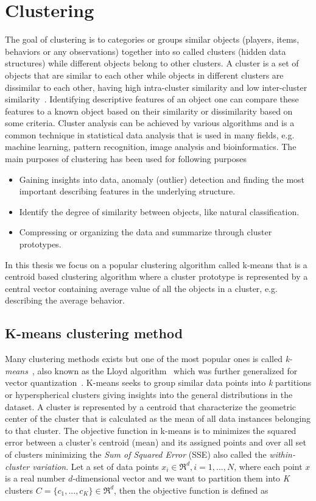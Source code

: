 \section{Clustering}
The goal of clustering is to categories or groups similar objects (players, items, behaviors or any observations) together into so called clusters (hidden data structures) while different objects belong to other clusters. A cluster is a set of objects that are similar to each other while objects in different clusters are dissimilar to each other, having high intra-cluster similarity and low inter-cluster similarity~\citep{Xu:2009Clu}. Identifying descriptive features of an object one can compare these features to a known object based on their similarity or dissimilarity based on some criteria. Cluster analysis can be achieved by various algorithms and is a common technique in statistical data analysis that is used in many fields, e.g. machine learning, pattern recognition, image analysis and bioinformatics. The main purposes of clustering has been used for following purposes
\begin{itemize}
\item Gaining insights into data, anomaly (outlier) detection and finding the most important describing features in the underlying structure.
\item Identify the degree of similarity between objects, like natural classification.
\item Compressing or organizing the data and summarize through cluster prototypes.
\end{itemize}

In this thesis we focus on a popular clustering algorithm called k-means that is a centroid based clustering algorithm where a cluster prototype is represented by a central vector containing average value of all the objects in a cluster, e.g. describing the average behavior.

\subsection{K-means clustering method}
\label{subsec:kmeansclustering}
Many clustering methods exists but one of the most popular ones is called \textit{k-means}~\citep{FORGYE.W.:1965,MacQueen:1967KMeans}, also known as the Lloyd algorithm~\citep{Lloyd:1982} which was further generalized for vector quantization~\citep{Linde:1980VQ,Gersho:1991VQS,Xu:2009Clu}. K-means seeks to group similar data points into \textit{k} partitions or hyperspherical clusters giving insights into the general distributions in the dataset. A cluster is represented by a centroid that characterize the geometric center of the cluster that is calculated as the mean of all data instances belonging to that cluster. The objective function in k-means is to minimizes the squared error between a cluster's centroid (mean) and its assigned points and over all set of clusters minimizing the \textit{Sum of Squared Error} (SSE) also called the \textit{within-cluster variation}. Let a set of data points $x_i \in \Re^d, i=1,...,N$, where each point $x$ is a real number $d$-dimensional vector and we want to partition them into \textit{K} clusters $C=\{c_1,...,c_K\} \in \Re^d$, then the objective function is defined as


